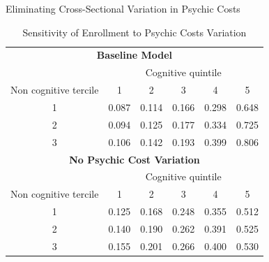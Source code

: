 \documentclass{beamer}
\begin{document}
\begin{frame}[label=Psychic1]{Eliminating Cross-Sectional Variation in Psychic Costs}
\hyperlink{Return6}{}

\begin {table}[H]
\caption {Sensitivity of Enrollment to Psychic Costs Variation} \label{tab:title} 
\begin{center}
  \begin{tabular}{c | c  c  c  c  c}
    
\multicolumn{6}{c}{\textbf{Baseline Model}} \\
 
  & \multicolumn{5}{c}{Cognitive quintile} \\ 

Non cognitive tercile  & 1 & 2& 3& 4& 5\\\hline

1   & 0.087 & 0.114& 0.166& 0.298& 0.648\\
2 & 0.094& 0.125 &0.177 &0.334 &0.725\\
3 & 0.106 & 0.142 &0.193 &0.399 &0.806\\\hline

\multicolumn{6}{c}{\textbf{No Psychic Cost Variation}} \\ \hline


 & \multicolumn{5}{c}{Cognitive quintile} \\ 
Non cognitive tercile  & 1& 2 &3 &4 &5\\\hline
 1 &     0.125& 0.168 &0.248& 0.355& 0.512\\
 2& 0.140 &0.190 &0.262 &0.391& 0.525\\
 3 &  0.155 &0.201& 0.266 &0.400& 0.530\\\hline
 

\end{tabular}
\end{center}
\end {table}
\end{frame}
\end{document}
